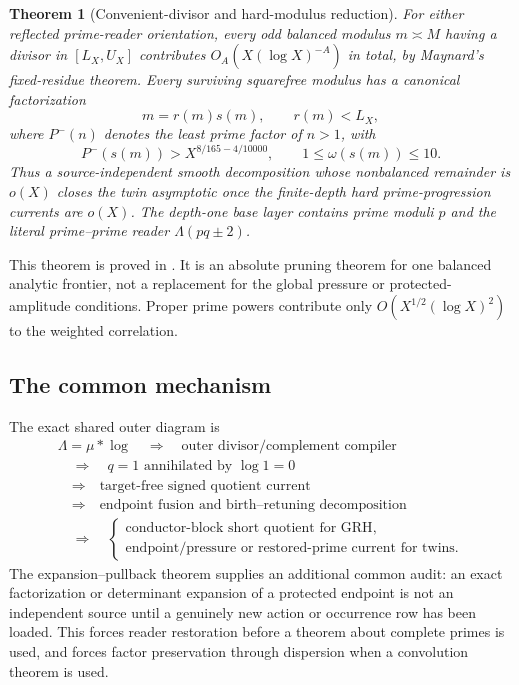 \documentclass[11pt]{article}
\newtheorem{theorem}{Theorem}[section]
\theoremstyle{definition}
\theoremstyle{remark}
\begin{document}
\begin{theorem}[Convenient-divisor and hard-modulus reduction]
\label{thm:intro-hard-modulus}
For either reflected prime-reader orientation, every odd balanced modulus
$m\asymp M$ having a divisor in $[L_X,U_X]$ contributes
$O_A(X(\log X)^{-A})$ in total, by Maynard's fixed-residue theorem.  Every
surviving squarefree modulus has a canonical factorization
\[
 m=r(m)s(m),
 \qquad r(m)<L_X,
\]
where $P^-(n)$ denotes the least prime factor of $n>1$, with
\[
 P^-(s(m))>X^{8/165-4/10000},
 \qquad 1\le\omega(s(m))\le10.
\]
Thus a source-independent smooth decomposition whose nonbalanced remainder is
$o(X)$ closes the twin asymptotic once the finite-depth hard prime-progression
currents are $o(X)$.  The depth-one base layer contains prime moduli $p$ and
the literal prime--prime reader $\Lambda(pq\pm2)$.
\end{theorem}

This theorem is proved in .  It is an absolute
pruning theorem for one balanced analytic frontier, not a replacement for the
global pressure or protected-amplitude conditions.  Proper prime powers
contribute only $O(X^{1/2}(\log X)^2)$ to the weighted correlation.

\subsection{The common mechanism}

The exact shared outer diagram is
\[
 \boxed{
 \begin{gathered}
 \Lambda=\mu*\log
 \quad\Longrightarrow\quad
 \text{outer divisor/complement compiler}\\[0.2em]
 \quad\Longrightarrow\quad
 q=1\text{ annihilated by }\log1=0\\[0.2em]
 \quad\Longrightarrow\quad
 \text{target-free signed quotient current}\\[0.2em]
 \quad\Longrightarrow\quad
 \text{endpoint fusion and birth--retuning decomposition}\\[0.2em]
 \quad\Longrightarrow\quad
 \begin{cases}
 \text{conductor-block short quotient for GRH},\\
 \text{endpoint/pressure or restored-prime current for twins}.
 \end{cases}
 \end{gathered}}
\]
The expansion--pullback theorem supplies an additional common audit: an exact
factorization or determinant expansion of a protected endpoint is not an
independent source until a genuinely new action or occurrence row has been
loaded.  This forces reader restoration before a theorem about complete
primes is used, and forces factor preservation through dispersion when a
convolution theorem is used.
\end{document}
